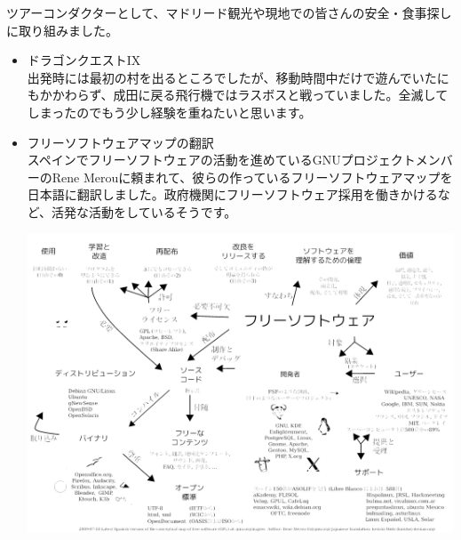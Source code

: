 \documentclass[mingoth,a4paper]{jsarticle}
\begin{document}
ツアーコンダクターとして、マドリード観光や現地での皆さんの安全・食事探しに取り組みました。

\begin{itemize}
\item ドラゴンクエストIX\\
  出発時には最初の村を出るところでしたが、移動時間中だけで遊んでいたにもかかわらず、成田に戻る飛行機ではラスボスと戦っていました。全滅してしまったのでもう少し経験を重ねたいと思います。
\item フリーソフトウェアマップの翻訳\\
  スペインでフリーソフトウェアの活動を進めているGNUプロジェクトメンバーのRene Merouに頼まれて、彼らの作っているフリーソフトウェアマップを日本語に翻訳しました。政府機関にフリーソフトウェア採用を働きかけるなど、活発な活動をしているそうです。


\includegraphics[width=15cm]{image200908/map-ja_mono.png}



\end{itemize}
\end{document}
